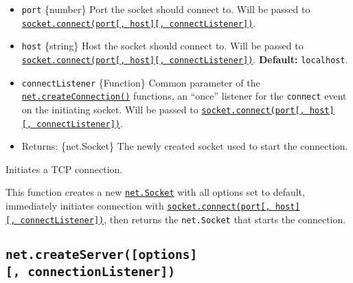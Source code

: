 \begin{itemize}
\tightlist
\item
  \texttt{port} \{number\} Port the socket should connect to. Will be
  passed to
  \hyperref[socketconnectport-host-connectlistener]{\texttt{socket.connect(port{[},\ host{]}{[},\ connectListener{]})}}.
\item
  \texttt{host} \{string\} Host the socket should connect to. Will be
  passed to
  \hyperref[socketconnectport-host-connectlistener]{\texttt{socket.connect(port{[},\ host{]}{[},\ connectListener{]})}}.
  \textbf{Default:}
  \texttt{\textquotesingle{}localhost\textquotesingle{}}.
\item
  \texttt{connectListener} \{Function\} Common parameter of the
  \hyperref[netcreateconnection]{\texttt{net.createConnection()}}
  functions, an ``once'' listener for the
  \texttt{\textquotesingle{}connect\textquotesingle{}} event on the
  initiating socket. Will be passed to
  \hyperref[socketconnectport-host-connectlistener]{\texttt{socket.connect(port{[},\ host{]}{[},\ connectListener{]})}}.
\item
  Returns: \{net.Socket\} The newly created socket used to start the
  connection.
\end{itemize}

Initiates a TCP connection.

This function creates a new
\hyperref[class-netsocket]{\texttt{net.Socket}} with all options set to
default, immediately initiates connection with
\hyperref[socketconnectport-host-connectlistener]{\texttt{socket.connect(port{[},\ host{]}{[},\ connectListener{]})}},
then returns the \texttt{net.Socket} that starts the connection.

\subsection{\texorpdfstring{\texttt{net.createServer({[}options{]}{[},\ connectionListener{]})}}{net.createServer({[}options{]}{[}, connectionListener{]})}}\label{net.createserveroptions-connectionlistener}

